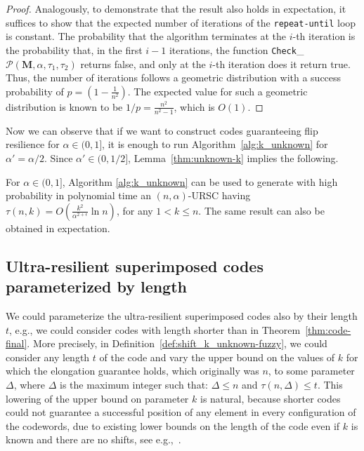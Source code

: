 \documentclass[11pt]{article}
\begin{document}
\begin{proof}
Analogously, to demonstrate that the result also holds in expectation, it suffices to show that the expected number of iterations of the \texttt{repeat-until} loop is constant.
The probability that the algorithm terminates at the $i$-th iteration is the probability that, in the first $i-1$ iterations, the function 
\texttt{Check}\_$\mathcal{P}(\mathbf{M}, \alpha, \tau_1, \tau_2)$ returns {\sc false}, 
and only at the $i$-th iteration does it return {\sc true}. 
Thus, the number of iterations follows a geometric distribution with a success probability 
of $p = (1 - \frac{1}{n^2})$. 
The expected value for such a geometric distribution is known to be 
$1/p = \frac{n^2}{n^2 - 1}$, which is $O(1)$.
\end{proof}

Now we can observe that if we want to construct codes guaranteeing flip resilience for $\alpha\in (0,1]$, 
it is enough to run Algorithm~\ref{alg:k_unknown} for $\alpha'=\alpha/2$. Since 
$\alpha'\in (0,1/2]$, Lemma~\ref{thm:unknown-k} implies the following.



\begin{theorem}
\label{thm:code-final}
For 
$\alpha \in (0, 1]$, Algorithm \ref{alg:k_unknown} can be used to generate with high probability 
in polynomial time an $(n, \alpha)$-URSC having \elongation\
$\tau(n, k) = O\left(\frac{k^2}{\alpha^{2 + \epsilon}} \ln n\right)$,
for any $1 < k \leq n$. The same result can also be obtained in expectation.
\end{theorem}


\subsection{Ultra-resilient superimposed codes parameterized by length}

We could parameterize the ultra-resilient superimposed codes also by their length $t$, e.g., we could consider codes with length shorter than in Theorem~\ref{thm:code-final}.
More precisely, in Definition~\ref{def:shift_k_unknown-fuzzy}, we could consider any length $t$ of the code and vary the upper bound on the values of $k$ for which 
the elongation guarantee holds, which originally was $n$, to some parameter $\Delta$, where $\Delta$ is the maximum integer such that: 
$\Delta\le n$ and 
$\tau(n,\Delta)\le t$. This lowering of the upper bound on parameter $k$ is natural, because shorter codes could not guarantee a successful position of any element in every configuration of the codewords, due to existing lower bounds on the length of the code even if $k$ is known and there are no shifts, see e.g.,~\cite{AV1982}.
\end{document}
